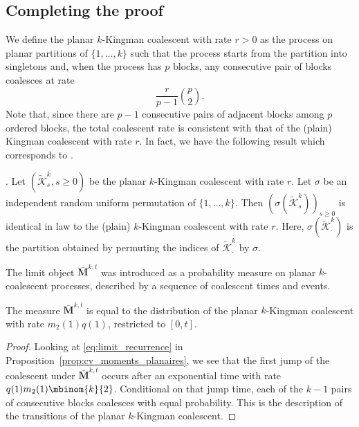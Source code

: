 \begin{refsegment}
\subsection{Completing the proof}

We define the planar $k$-Kingman coalescent with rate $r>0$ as the
process on planar partitions of $\{1,\ldots, k\}$ such that the process starts from
the partition into singletons and, when the process has $p$ blocks, any
consecutive pair of blocks coalesces at rate
 \[
\frac{r}{p-1} \binom{p}{2}.
\] 
Note that, since there are $p-1$ consecutive pairs of
adjacent blocks among $p$ ordered blocks, the total coalescent rate is
consistent with that of the (plain) Kingman coalescent with rate
$r$. In fact, we have the following result which corresponds to \citet*[Lemma~3.1]{Foutel-Rodier:UMS}.

\begin{lem}{\cite{Foutel-Rodier:UMS}.}\label{lem:felix}
    Let $(\widetilde{\mathcal K}^{k}_s, s\geq 0)$ be the planar $k$-Kingman
    coalescent with rate $r$. Let $\sigma$ be an independent random
    uniform permutation of $\{1,\ldots, k\}$. Then $(\sigma(\widetilde{\mathcal K}^{k}_s))_{s \geqslant 0}$
    is identical in law to the (plain) $k$-Kingman coalescent with
    rate $r$. Here, $\sigma(\widetilde{\mathcal K}^{k}_\cdot)$ is the partition
    obtained by permuting the indices of $\widetilde{\mathcal K}^{k}_\cdot$ by $\sigma$.
\end{lem}
The limit object $\mathbf{\bar M}^{k,t}$ was introduced as a probability measure on planar $k$-coalescent processes, described by a sequence of coalescent times and events.
\begin{prop}\label{prop:deplanarization}
    The measure $\mathbf{\bar M}^{k,t}$ is equal to the distribution of
    the planar $k$-Kingman coalescent with rate $m_2(1) q(1)$, restricted
    to $[0, t]$. 
\end{prop}

\begin{proof}
    Looking at \eqref{eq:limit_recurrence} in 
    Proposition~\ref{prop:cv_moments_planaires}, we see that the first
    jump of the coalescent under $\mathbf{\bar{M}}^{k,t}$ occurs after an
    exponential time with rate $q(1)m_2(1) \mbinom{k}{2}$. Conditional on
    that jump time, each of the $k-1$ pairs of consecutive blocks
    coalesces with equal probability. This is the description of the
    transitions of the planar $k$-Kingman coalescent.
\end{proof}


\end{refsegment}
